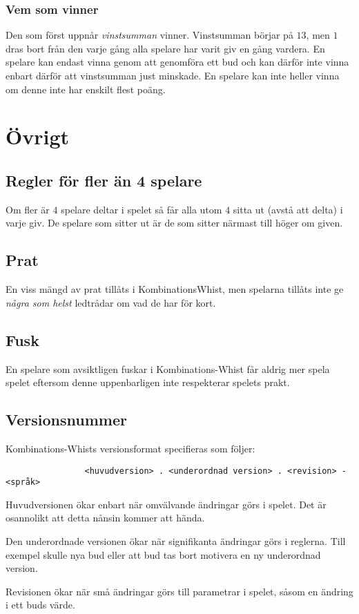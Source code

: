 \documentclass[a4paper]{article}
\begin{document}
{{			\subsubsection{Vem som vinner}{%
				Den som först uppnår \emph{vinstsumman} vinner. Vinstsumman börjar på $13$, men $1$ dras bort från den varje gång alla spelare har varit giv en gång vardera. En spelare kan endast vinna genom att genomföra ett bud och kan därför inte vinna enbart därför att vinstsumman just minskade. En spelare kan inte heller vinna om denne inte har enskilt flest poäng.
			}
		}
	}

	\section{Övrigt}{%
		\subsection{Regler för fler än 4 spelare}{%
			Om fler är $4$ spelare deltar i spelet så får alla utom $4$ sitta ut (avstå att delta) i varje giv. De spelare som sitter ut är de som sitter närmast till höger om given.
			
			
		}
		
		\subsection{Prat}{%
			En viss mängd av prat tillåts i KombinationsWhist, men spelarna tillåts inte ge \emph{några som helst} ledtrådar om vad de har för kort.
		}
		
		\subsection{Fusk}{%
			En spelare som avsiktligen fuskar i Kombinations-Whist får aldrig mer spela spelet eftersom denne uppenbarligen inte respekterar spelets prakt.
		}

		\subsection{Versionsnummer}{%
			Kombinations-Whists versionsformat specifieras som följer:

			\begin{verbatim}
				<huvudversion> . <underordnad version> . <revision> - <språk>
			\end{verbatim}

			Huvudversionen ökar enbart när omvälvande ändringar görs i spelet. Det är osannolikt att detta nånsin kommer att hända.

			Den underordnade versionen ökar när signifikanta ändringar görs i reglerna. Till exempel skulle nya bud eller att bud tas bort motivera en ny underordnad version.

			Revisionen ökar när små ändringar görs till parametrar i spelet, såsom en ändring i ett buds värde.
		}
	}

	\pagebreak
	
	
\end{document}
